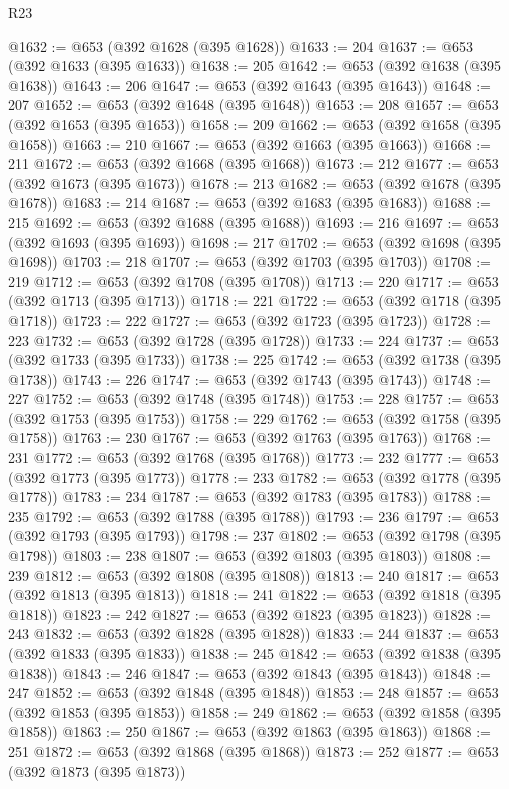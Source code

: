 \begin{lexlean}{R23}
\begin{coremodule}
@1632 := @653 (@392 @1628 (@395 @1628))
@1633 := 204
@1637 := @653 (@392 @1633 (@395 @1633))
@1638 := 205
@1642 := @653 (@392 @1638 (@395 @1638))
@1643 := 206
@1647 := @653 (@392 @1643 (@395 @1643))
@1648 := 207
@1652 := @653 (@392 @1648 (@395 @1648))
@1653 := 208
@1657 := @653 (@392 @1653 (@395 @1653))
@1658 := 209
@1662 := @653 (@392 @1658 (@395 @1658))
@1663 := 210
@1667 := @653 (@392 @1663 (@395 @1663))
@1668 := 211
@1672 := @653 (@392 @1668 (@395 @1668))
@1673 := 212
@1677 := @653 (@392 @1673 (@395 @1673))
@1678 := 213
@1682 := @653 (@392 @1678 (@395 @1678))
@1683 := 214
@1687 := @653 (@392 @1683 (@395 @1683))
@1688 := 215
@1692 := @653 (@392 @1688 (@395 @1688))
@1693 := 216
@1697 := @653 (@392 @1693 (@395 @1693))
@1698 := 217
@1702 := @653 (@392 @1698 (@395 @1698))
@1703 := 218
@1707 := @653 (@392 @1703 (@395 @1703))
@1708 := 219
@1712 := @653 (@392 @1708 (@395 @1708))
@1713 := 220
@1717 := @653 (@392 @1713 (@395 @1713))
@1718 := 221
@1722 := @653 (@392 @1718 (@395 @1718))
@1723 := 222
@1727 := @653 (@392 @1723 (@395 @1723))
@1728 := 223
@1732 := @653 (@392 @1728 (@395 @1728))
@1733 := 224
@1737 := @653 (@392 @1733 (@395 @1733))
@1738 := 225
@1742 := @653 (@392 @1738 (@395 @1738))
@1743 := 226
@1747 := @653 (@392 @1743 (@395 @1743))
@1748 := 227
@1752 := @653 (@392 @1748 (@395 @1748))
@1753 := 228
@1757 := @653 (@392 @1753 (@395 @1753))
@1758 := 229
@1762 := @653 (@392 @1758 (@395 @1758))
@1763 := 230
@1767 := @653 (@392 @1763 (@395 @1763))
@1768 := 231
@1772 := @653 (@392 @1768 (@395 @1768))
@1773 := 232
@1777 := @653 (@392 @1773 (@395 @1773))
@1778 := 233
@1782 := @653 (@392 @1778 (@395 @1778))
@1783 := 234
@1787 := @653 (@392 @1783 (@395 @1783))
@1788 := 235
@1792 := @653 (@392 @1788 (@395 @1788))
@1793 := 236
@1797 := @653 (@392 @1793 (@395 @1793))
@1798 := 237
@1802 := @653 (@392 @1798 (@395 @1798))
@1803 := 238
@1807 := @653 (@392 @1803 (@395 @1803))
@1808 := 239
@1812 := @653 (@392 @1808 (@395 @1808))
@1813 := 240
@1817 := @653 (@392 @1813 (@395 @1813))
@1818 := 241
@1822 := @653 (@392 @1818 (@395 @1818))
@1823 := 242
@1827 := @653 (@392 @1823 (@395 @1823))
@1828 := 243
@1832 := @653 (@392 @1828 (@395 @1828))
@1833 := 244
@1837 := @653 (@392 @1833 (@395 @1833))
@1838 := 245
@1842 := @653 (@392 @1838 (@395 @1838))
@1843 := 246
@1847 := @653 (@392 @1843 (@395 @1843))
@1848 := 247
@1852 := @653 (@392 @1848 (@395 @1848))
@1853 := 248
@1857 := @653 (@392 @1853 (@395 @1853))
@1858 := 249
@1862 := @653 (@392 @1858 (@395 @1858))
@1863 := 250
@1867 := @653 (@392 @1863 (@395 @1863))
@1868 := 251
@1872 := @653 (@392 @1868 (@395 @1868))
@1873 := 252
@1877 := @653 (@392 @1873 (@395 @1873))

\end{coremodule}
\end{lexlean}

